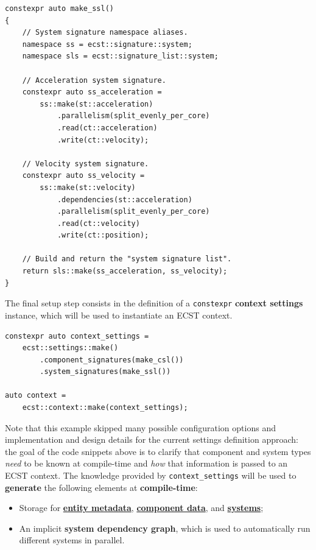 \documentclass[oneside, 12pt, a4paper, openany]{book}
\begin{document}
\begin{verbatim}
constexpr auto make_ssl()
{
    // System signature namespace aliases.
    namespace ss = ecst::signature::system;
    namespace sls = ecst::signature_list::system;

    // Acceleration system signature.
    constexpr auto ss_acceleration =
        ss::make(st::acceleration)
            .parallelism(split_evenly_per_core)
            .read(ct::acceleration)
            .write(ct::velocity);

    // Velocity system signature.
    constexpr auto ss_velocity =
        ss::make(st::velocity)
            .dependencies(st::acceleration)
            .parallelism(split_evenly_per_core)
            .read(ct::velocity)
            .write(ct::position);

    // Build and return the "system signature list".
    return sls::make(ss_acceleration, ss_velocity);
}
\end{verbatim}

The final setup step consists in the definition of a
\texttt{constexpr}
\textbf{context settings} instance, which will be used to instantiate an
ECST context.

\begin{verbatim}
constexpr auto context_settings =
    ecst::settings::make()
        .component_signatures(make_csl())
        .system_signatures(make_ssl())

auto context =
    ecst::context::make(context_settings);
\end{verbatim}

Note that this example skipped many possible configuration options and
implementation and design details for the current settings definition
approach: the goal of the code snippets above is to clarify that
component and system types \emph{need} to be known at compile-time and
\emph{how} that information is passed to an ECST context. The knowledge
provided by
\texttt{context_settings}
will be used to \textbf{generate} the following elements at
\textbf{compile-time}:

\begin{itemize}
\item
  Storage for \protect\hyperlink{storage_entity}{\textbf{entity
  metadata}}, \protect\hyperlink{storage_component}{\textbf{component
  data}}, and \protect\hyperlink{storage_system}{\textbf{systems}};
\item
  An implicit \textbf{system dependency graph}, which is used to
  automatically run different systems in parallel.
\end{itemize}
\end{document}
